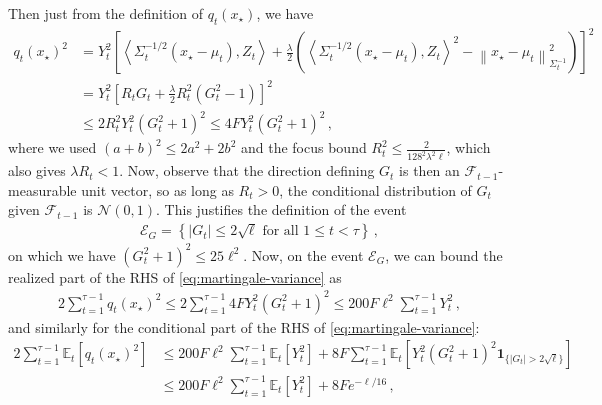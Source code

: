 \documentclass{article}
\newcommand{\E}{\mathbb E}
\newcommand{\F}{\mathcal F}
\newcommand{\N}{\mathcal N}
\newcommand{\1}{\mathbf 1}
\newcommand{\normm}[2]{\left\lVert #1\right\rVert_{#2}}
\begin{document}
Then just from the definition of $q_t(x_\star)$, we have
\begin{align}
    q_t(x_{\star})^2
     & =
    Y_t^2\left[
        \left\langle \Sigma_t^{-1/2}(x_\star - \mu_t), Z_t \right\rangle
        + \frac{\lambda}{2}\left(
        \left\langle \Sigma_t^{-1/2}(x_\star - \mu_t), Z_t \right\rangle^2
        - \normm{x_\star - \mu_t}{\Sigma_t^{-1}}^2
        \right)
    \right]^2 \\
     & =
    Y_t^2\left[
        R_t G_t
        + \frac{\lambda}{2} R_t^2 \left(G_t^2 - 1\right)
    \right]^2 \\
     & \leq
    2R_t^2Y_t^2\left(G_t^2+1\right)^2
    \leq
    4F Y_t^2\left(G_t^2+1\right)^2
    \,,
    \label{eq:quadratic-estimate-decomposition}
\end{align}
where we used $(a+b)^2\leq2a^2+2b^2$ and the focus bound $R_t^2\leq\frac{2}{128^2\lambda^2 \ell}$, which also gives $\lambda R_t<1$.
Now, observe that the direction defining $G_t$ is then an
$\F_{t-1}$-measurable unit vector, so as long as $R_t>0$, the conditional distribution of
$G_t$ given $\F_{t-1}$ is $\N(0,1)$.
This justifies the definition of the event
\begin{align}
    \mathcal E_G
    =\left\{
    |G_t|\leq2\sqrt\ell
    \text{ for all }1\leq t< \tau
    \right\}
    \,,
    \label{eq:gaussian-score-event}
\end{align}
on which we have $(G_t^2+1)^2\leq25\ell^2$.
Now, on the event $\mathcal E_G$, we can bound the realized part of the RHS of \eqref{eq:martingale-variance} as
\begin{align}
    2\sum_{t=1}^{\tau-1}
    q_t(x_\star)^2
    \leq
    2\sum_{t=1}^{\tau-1}
    4F Y_t^2\left(G_t^2+1\right)^2
    \leq
    200 F \ell^2 \sum_{t=1}^{\tau-1}
    Y_t^2
    \,,
    \label{eq:quadratic-bound}
\end{align}
and similarly for the conditional part of the RHS of \eqref{eq:martingale-variance}:
\begin{align}
    2\sum_{t=1}^{\tau-1}
    \E_t[q_t(x_\star)^2]
     & \leq
    200 F \ell^2 \sum_{t=1}^{\tau-1}
    \E_t[Y_t^2]
    +
    8F \sum_{t=1}^{\tau-1}\E_t\left[Y_t^2(G_t^2+1)^2\1_{\{|G_t|>2\sqrt\ell\}}\right]
    \\
     & \leq
    200 F \ell^2 \sum_{t=1}^{\tau-1}
    \E_t[Y_t^2]
    +
    8Fe^{-\ell/16}
    \,,
\end{align}
\end{document}
